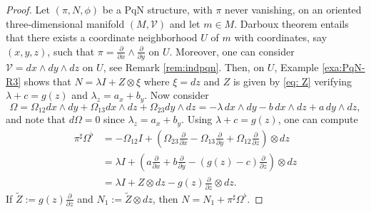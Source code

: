 \documentclass[12pt]{article}
\begin{document}
\begin{proof}
Let $(\pi,N,\phi)$ be a PqN structure, with $\pi$ never vanishing, on an oriented three-dimensional manifold  $\left(M,\mathcal V\right)$ and let $m\in M$. Darboux theorem entails that there exists a coordinate neighborhood $U$ of  $m$ with coordinates, say $(x,y,z)$, such that $\pi=\frac{\partial}{\partial x}\wedge\frac{\partial}{\partial y}$ on $U$. %
Moreover, one can consider $\mathcal V=dx\wedge dy\wedge dz$ on $U$, see Remark \ref{rem:indpqn}. Then, on $U$, Example \ref{exa:PqN-R3} shows that $N=\lambda I+Z\otimes \xi$ where $\xi=dz$ and $Z$ is given by \eqref{eq: Z} verifying $\lambda+c=g(z)$ and $\lambda_z=a_x+b_y$.  Now consider
\[
\Omega=\Omega_{12}dx\wedge dy+\Omega_{13}dx\wedge dz+\Omega_{23}dy\wedge dz
=-\lambda\, dx\wedge dy-b\,dx\wedge dz+a\,dy\wedge dz,
\]
and note that $d\Omega=0$ since $\lambda_z=a_x+b_y$. Using $\lambda+c=g(z)$, %
one can compute
\begin{align*}
\pi^{\sharp}\Omega^{\flat}%
&=-\Omega_{12} I+\left(\Omega_{23}\frac{\partial}{\partial x}-\Omega_{13}\frac{\partial}{\partial y}+\Omega_{12}\frac{\partial}{\partial z}\right)\otimes dz\\
&=\lambda I+\left(a\frac{\partial}{\partial x}+b\frac{\partial}{\partial y}-(g(z)-c)\frac{\partial}{\partial z}\right)\otimes dz\\
&=\lambda I+%
Z\otimes dz-g(z)\frac{\partial}{\partial z}\otimes dz.
\end{align*}
If $\widetilde{Z}:=g(z)\frac{\partial}{\partial z}$ and $N_1:=\widetilde{Z}\otimes dz$, 
then %
$N=N_1+\pi^{\sharp}\Omega^{\flat}$.

\end{proof}
\end{document}
